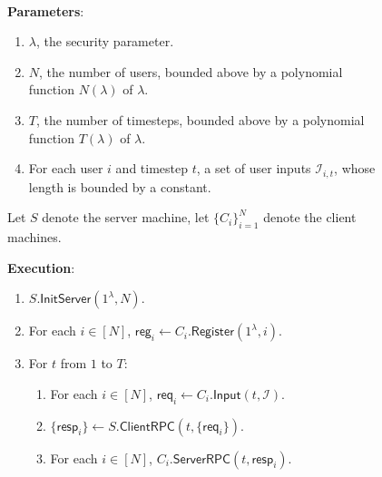 \documentclass[sigconf, nonacm, balance=false, natbib=false, screen]{acmart}
\newcommand{\reg}{\mathsf{reg}}
\newcommand{\req}{\mathsf{req}}
\newcommand{\resp}{\mathsf{resp}}
\newcommand{\cI}{\mathcal{I}}
\begin{document}
\begin{figure}[h!]
\begin{framed}
\begin{definition}  \hfill\\
    
\textbf{Parameters}: \begin{enumerate}
    \item $\lambda$, the security parameter.
    \item $N$, the number of users, bounded above by a polynomial function $N(\lambda)$ of $\lambda$.
    \item $T$, the number of timesteps, bounded above by a polynomial function $T(\lambda)$ of $\lambda$.
    \item For each user $i$ and timestep $t$, a set of user inputs $\cI_{i, t}$, whose length is bounded by a constant.
\end{enumerate}

Let $S$ denote the server machine, let $\{C_i\}_{i = 1}^N$ denote the client machines.

\textbf{Execution}:
\begin{enumerate}
\item $S.\mathsf{InitServer}(1^{\lambda}, N)$. 
\item For each $i \in [N]$, $\reg_i \leftarrow C_i.\mathsf{Register}(1^{\lambda}, i)$. 
\item For $t$ from $1$ to $T$:
    \begin{enumerate}
    \item For each $i \in [N]$, $\req_i \leftarrow C_i.\mathsf{Input}(t, \cI)$.
    
    \item $\{\resp_i\} \leftarrow S.\mathsf{ClientRPC}(t, \{\req_i\})$.
    
    \item For each $i \in [N]$, $C_i.\mathsf{ServerRPC}(t, \resp_i)$.
    \end{enumerate}
\end{enumerate}
\end{definition}
\end{framed}
\end{figure}
\end{document}
